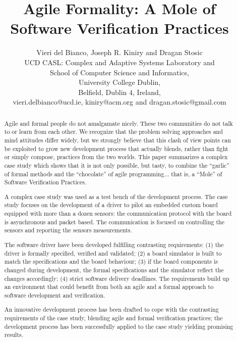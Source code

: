 \documentclass[english]{lni}
\begin{document}
\title{Agile Formality: A Mole of Software Verification Practices}

\author{Vieri del Bianco, Joseph R. Kiniry and Dragan Stosic\\
  UCD CASL: Complex and Adaptive Systems Laboratory and\\
  School of Computer Science and Informatics,\\
  University College Dublin,\\
  Belfield, Dublin 4, Ireland,\\
  vieri.delbianco@ucd.ie, kiniry@acm.org and dragan.stosic@gmail.com\\
}

\maketitle

\begin{abstract}

Agile and formal people do not amalgamate nicely. These two communities do not talk to or learn from each other. We recognize that the problem solving approaches and mind attitudes differ widely, but we strongly believe that this clash of view points can be exploited to grow new development process that actually blends, rather than fight or simply compose, practices from the two worlds. This paper summarizes a complex case study which shows that it is not only possible, but tasty, to combine the ``garlic'' of formal methods and the ``chocolate'' of agile programming... that is, a ``Mole'' of Software Verification Practices.

A complex case study was used as a test bench of the development process. The case study focuses on the development of a driver to pilot an embedded custom board equipped with more than a dozen sensors: the communication protocol with the board is asynchronous and packet based. The communication is focused on controlling the sensors and reporting the sensors measurements.

The software driver have been developed fulfilling contrasting requirements: (1) the driver is formally specified, verified and validated; (2) a board simulator is built to match the specifications and the board behaviour; (3) if the board components is changed during development, the formal specifications and the simulator reflect the changes accordingly; (4) strict software delivery deadlines. The requirements build up an environment that could benefit from both an agile and a formal approach to software development and verification.

An innovative development process has been drafted to cope with the contrasting requirements of the case study, blending agile and formal verification practices; the development process has been successfully applied to the case study yielding promising results. 

\end{abstract}
\end{document}

